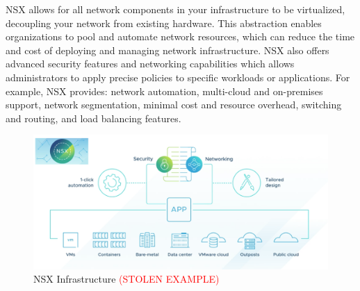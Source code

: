NSX allows for all network components in your infrastructure to be virtualized, decoupling your network from existing hardware. This abstraction enables organizations to pool and automate network resources, which can reduce the time and cost of deploying and managing network infrastructure. NSX also offers advanced security features and networking capabilities which allows administrators to apply precise policies to specific workloads or applications. For example, NSX provides: network automation, multi-cloud and on-premises support, network segmentation, minimal cost and resource overhead, switching and routing, and load balancing features. 

\begin{figure}[H]
    \centering
    \includegraphics[scale = .19]{images/nsx-diagram.png}
    \caption{NSX Infrastructure \textcolor{red}{(STOLEN EXAMPLE)} }
    \label{NSX}
\end{figure}